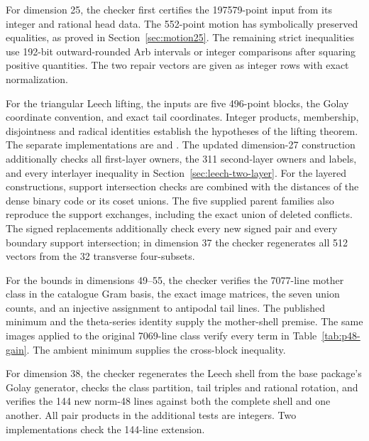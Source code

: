For dimension 25, the checker first certifies the 197579-point input
from its integer and rational head data. The 552-point motion has
symbolically preserved equalities, as proved in
Section~\ref{sec:motion25}. The remaining strict inequalities use
192-bit outward-rounded Arb intervals or integer comparisons after
squaring positive quantities. The two repair vectors are given as
integer rows with exact normalization.

For the triangular Leech lifting, the inputs are five 496-point blocks, the Golay
coordinate convention, and exact tail coordinates. Integer products,
membership, disjointness and radical identities establish the hypotheses
of the lifting theorem. The separate implementations are
 and .
The updated dimension-27 construction additionally
checks all first-layer owners, the 311 second-layer owners and labels,
and every interlayer inequality in Section~\ref{sec:leech-two-layer}.
For the layered constructions, support intersection
checks are combined with the distances of the dense binary code or its
coset unions. The five supplied parent families also reproduce the
support exchanges, including the exact union of deleted conflicts.
The signed replacements additionally check every new signed pair and
every boundary support intersection; in dimension 37 the checker
regenerates all 512 vectors from the 32 transverse four-subsets.

For the bounds in dimensions 49--55, the checker verifies the
7077-line mother class in the catalogue Gram basis, the exact image
matrices, the seven union counts, and an injective assignment to
antipodal tail lines. The published minimum and the theta-series
identity supply the mother-shell premise. The same images applied
to the original 7069-line class verify every term in
Table~\ref{tab:p48-gain}. The ambient minimum supplies the
cross-block inequality.

For dimension 38, the checker regenerates the Leech shell from
the base package's Golay generator, checks the class partition,
tail triples and rational rotation, and verifies the 144 new
norm-48 lines against both the complete shell and one another.
All pair products in the additional tests are integers. Two
implementations check the 144-line extension.

